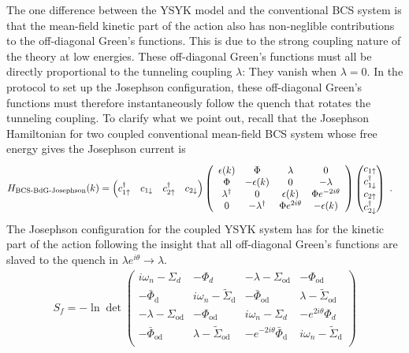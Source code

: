 The one difference between the YSYK model and the conventional BCS system is that the mean-field kinetic part of the action also has non-neglible contributions to the off-diagonal Green's functions. This is due to the strong coupling nature of the theory at low energies. These off-diagonal Green's functions must all be directly proportional to the tunneling coupling $\lambda$: They vanish when $\lambda=0$. In the protocol to set up the Josephson configuration, these off-diagonal Green's functions must therefore instantaneously follow the quench that rotates the tunneling coupling.
To clarify what we point out, recall that the Josephson Hamiltonian for two coupled conventional mean-field BCS system whose free energy gives the Josephson current is
\begin{align}
    H_{\text{BCS-BdG-Josephson}}(k) &= \begin{pmatrix} c^{\dagger}_{1\uparrow} & c_{1\downarrow} & c^{\dagger}_{2\uparrow} & c_{2\downarrow} \end{pmatrix}\left(
    \begin{array}{cccc}
     \epsilon(k)  & \Phi  & \lambda & 0 \\
     \Phi  & -\epsilon(k)  & 0 & -\lambda \\
     \lambda^{\dagger} & 0 & \epsilon(k)  & \Phi  e^{-2 i \theta } \\
     0 & -\lambda^{\dagger} & {\Phi}  e^{2 i \theta } & -\epsilon(k) \\
    \end{array}
    \right) \begin{pmatrix} c_{1\uparrow} \\ c^{\dagger}_{1\downarrow} \\ c_{2\uparrow} \\ c^{\dagger}_{2\downarrow} \end{pmatrix}~.
\end{align}
The Josephson configuration for the coupled YSYK system has for the kinetic part of the action following the insight that all off-diagonal Green's functions are slaved to the quench in $\lambda e^{i\theta}\rightarrow \lambda$.
\begin{align}
    S_f = -\ln\det
    \left(
    \begin{array}{cccc}
     i \omega _n -\Sigma _d  & -\Phi _d & -\lambda - \Sigma _{\text{od}} & -\Phi _{\text{od}} \\
     -\bar{\Phi} _{\text{d}} & i \omega_n -\tilde{\Sigma} _{\text{d}}  & - \bar{\Phi} _{\text{od}} & \lambda -\tilde{\Sigma} _{\text{od}} \\
     -\lambda - \Sigma _{\text{od}} & - \Phi _{\text{od}} & i \omega_n-\Sigma _d  & -e^{2 i \theta } \Phi _d \\
     -\bar{\Phi} _{\text{od}} & \lambda - \tilde{\Sigma} _{\text{od}} & -e^{-2 i \theta } \bar{\Phi} _{\text{d}} & i \omega_n -\tilde{\Sigma} _{\text{d}} \\
    \end{array}
    \right)
    \label{eq:Josephson-YSYK-action-kinectic}
\end{align}
